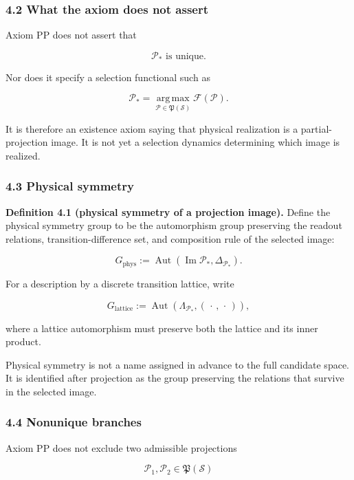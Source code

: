 \documentclass[
  a4paper,
]{article}
\begin{document}
\subsubsection{4.2 What the axiom does not
assert}\label{what-the-axiom-does-not-assert}

Axiom PP does not assert that

\[
\mathcal P_*
\text{ is unique}.
\]

Nor does it specify a selection functional such as

\[
\mathcal P_*
=
\operatorname*{arg\,max}_{\mathcal P\in\mathfrak P(\mathscr S)}
\mathcal F(\mathcal P).
\]

It is therefore an existence axiom saying that physical realization is a
partial-projection image. It is not yet a selection dynamics determining
which image is realized.

\subsubsection{4.3 Physical symmetry}\label{physical-symmetry}

\textbf{Definition 4.1 (physical symmetry of a projection image).}
Define the physical symmetry group to be the automorphism group
preserving the readout relations, transition-difference set, and
composition rule of the selected image:

\[
G_{\mathrm{phys}}
:=
\operatorname{Aut}
\left(
\operatorname{Im}\mathcal P_*,
\Delta_{\mathcal P_*}
\right).
\]

For a description by a discrete transition lattice, write

\[
G_{\mathrm{lattice}}
:=
\operatorname{Aut}
\left(
\Lambda_{\mathcal P_*},
(\,\cdot\,,\,\cdot\,)
\right),
\]

where a lattice automorphism must preserve both the lattice and its
inner product.

Physical symmetry is not a name assigned in advance to the full
candidate space. It is identified after projection as the group
preserving the relations that survive in the selected image.

\subsubsection{4.4 Nonunique branches}\label{nonunique-branches}

Axiom PP does not exclude two admissible projections

\[
\mathcal P_1,\mathcal P_2
\in
\mathfrak P(\mathscr S)
\]
\end{document}
